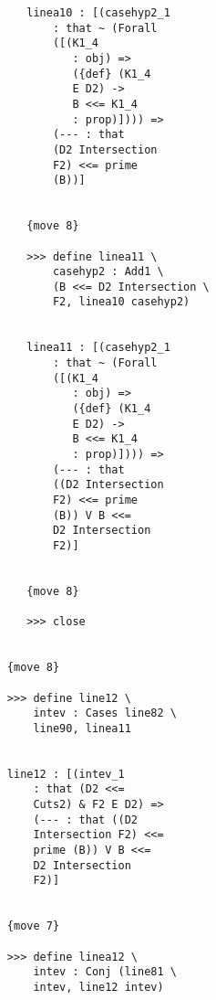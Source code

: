 \documentclass[12pt]{article}
\begin{document}
\begin{verbatim}
                           linea10 : [(casehyp2_1 
                               : that ~ (Forall 
                               ([(K1_4 
                                  : obj) => 
                                  ({def} (K1_4 
                                  E D2) -> 
                                  B <<= K1_4 
                                  : prop)]))) => 
                               (--- : that 
                               (D2 Intersection 
                               F2) <<= prime 
                               (B))]


                           {move 8}

                           >>> define linea11 \
                               casehyp2 : Add1 \
                               (B <<= D2 Intersection \
                               F2, linea10 casehyp2)


                           linea11 : [(casehyp2_1 
                               : that ~ (Forall 
                               ([(K1_4 
                                  : obj) => 
                                  ({def} (K1_4 
                                  E D2) -> 
                                  B <<= K1_4 
                                  : prop)]))) => 
                               (--- : that 
                               ((D2 Intersection 
                               F2) <<= prime 
                               (B)) V B <<= 
                               D2 Intersection 
                               F2)]


                           {move 8}

                           >>> close


                        {move 8}

                        >>> define line12 \
                            intev : Cases line82 \
                            line90, linea11


                        line12 : [(intev_1 
                            : that (D2 <<= 
                            Cuts2) & F2 E D2) => 
                            (--- : that ((D2 
                            Intersection F2) <<= 
                            prime (B)) V B <<= 
                            D2 Intersection 
                            F2)]


                        {move 7}

                        >>> define linea12 \
                            intev : Conj (line81 \
                            intev, line12 intev)



\end{verbatim}
\end{document}
